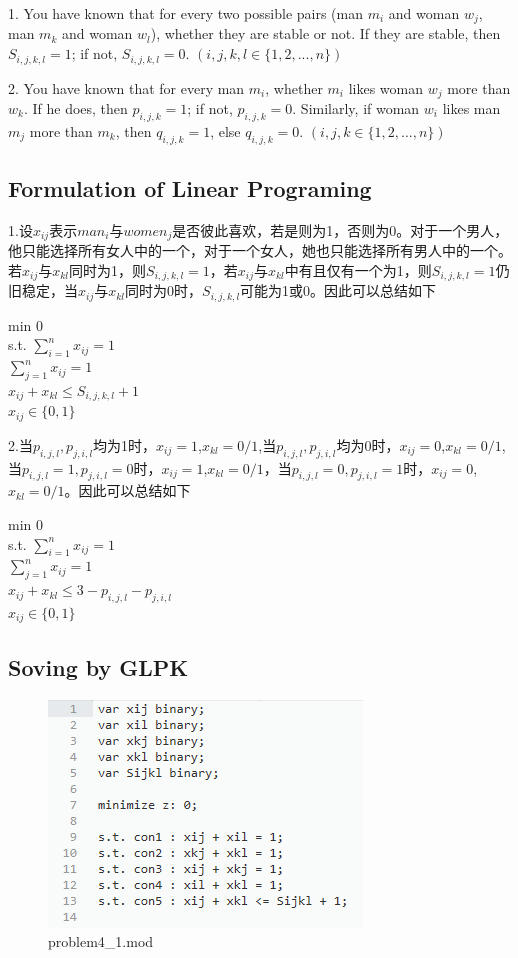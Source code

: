 \documentclass{article}
\begin{document}
1. You have known that for every two possible pairs (man $m_i$ and woman $w_j$, man $m_k$ and woman $w_l$), whether they are stable or not. If they are stable, then $S_{i,j,k,l} = 1$; if not, $S_{i,j,k,l} = 0$. $(i,j,k,l \in \{1,2,... ,n\})$

2. You have known that for every man $m_i$, whether $m_i$ likes woman $w_j$ more than $w_k$. If he does, then $p_{i,j,k} = 1$; if not, $p_{i,j,k} = 0$. Similarly, if woman $w_i$ likes man $m_j$ more than $m_k$, then $q_{i,j,k} = 1$, else $q_{i,j,k} = 0$. $(i,j,k \in \{1,2, ... ,n\})$



\subsection{Formulation of Linear Programing}
1.设$x_{ij}$表示$man_i$与$women_j$是否彼此喜欢，若是则为1，否则为0。对于一个男人，他只能选择所有女人中的一个，对于一个女人，她也只能选择所有男人中的一个。若$x_{ij}$与$x_{kl}$同时为1，则$S_{i,j,k,l}=1$，若$x_{ij}$与$x_{kl}$中有且仅有一个为1，则$S_{i,j,k,l}=1$仍旧稳定，当$x_{ij}$与$x_{kl}$同时为0时，$S_{i,j,k,l}$可能为1或0。因此可以总结如下

\begin{center}
min 0\\
s.t. $\sum_{i=1}^nx_{ij} = 1$\\
$\sum_{j=1}^nx_{ij} = 1$\\
$x_{ij}+x_{kl} \leq S_{i,j,k,l}+1$\\
$x_{ij} \in \{0,1\}$
\end{center} 


2.当$p_{i,j,l},p_{j,i,l}$均为1时，$x_{ij}=1$,$x_{kl}=0/1$,当$p_{i,j,l},p_{j,i,l}$均为0时，$x_{ij}=0$,$x_{kl}=0/1$, 当$p_{i,j,l}=1,p_{j,i,l}=0$时，$x_{ij}=1$,$x_{kl}=0/1$，当$p_{i,j,l}=0,p_{j,i,l}=1$时，$x_{ij}=0$,$x_{kl}=0/1$。因此可以总结如下

\begin{center}
min 0\\
s.t. $\sum_{i=1}^nx_{ij} = 1$\\
$\sum_{j=1}^nx_{ij} = 1$\\
$x_{ij}+x_{kl} \leq 3- p_{i,j,l}- p_{j,i,l}$\\
$x_{ij} \in \{0,1\}$
\end{center} 

\subsection{Soving by GLPK}
\begin{figure}
	\centering
	\includegraphics[width=0.4\linewidth]{problem4_1mod.png}
	\caption{problem4\_1.mod} 
\end{figure}
\end{document}

